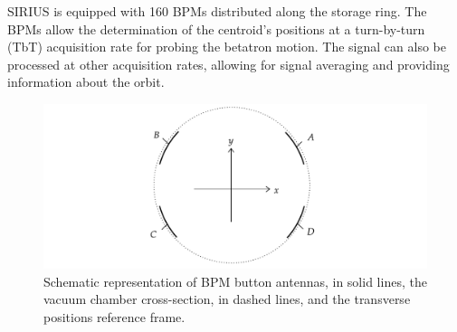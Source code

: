 SIRIUS is equipped with 160 BPMs distributed along the storage ring. The BPMs allow the determination of the centroid's positions at a turn-by-turn (TbT) acquisition rate for probing the betatron motion. The signal can also be processed at other acquisition rates, allowing for signal averaging and providing information about the orbit.
\begin{figure}
    \centering
    \includegraphics[width=\textwidth]{Images/bpm_scheme.pdf}
    \caption[Schematic representation of BPM button antennas, the vacuum chamber cross-section, and the transverse positions reference frame.]{Schematic representation of BPM button antennas, in solid lines, the vacuum chamber cross-section, in dashed lines, and the transverse positions reference frame.}
    \label{fig:bpms_scheme}
\end{figure}
